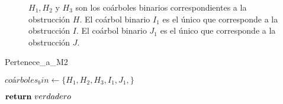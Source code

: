 \begin{figure}[ht!]
\begin{subfigure}{0.6\textwidth}
\end{subfigure}
\setlength{\abovecaptionskip}{5pt}
\caption{$H_1, H_2$ y $H_3$ son los coárboles binarios correspondientes a la obstrucción $H$. El coárbol binario $I_1$ es el único que corresponde a la obstrucción $I$. El coárbol binario $J_1$ es el único que corresponde a la obstrucción $J$.}\label{fig_obsts_bin}


\end{figure}


\begin{algorithm}[!htbp]
\caption{Pertenece\_a\_M2}
\label{alg_decision}
\DontPrintSemicolon %

 $coárboles_bin \gets \{H_1, H_2, H_3, I_1, J_1, \}$\;


$\Return\ verdadero$\;

\end{algorithm}
